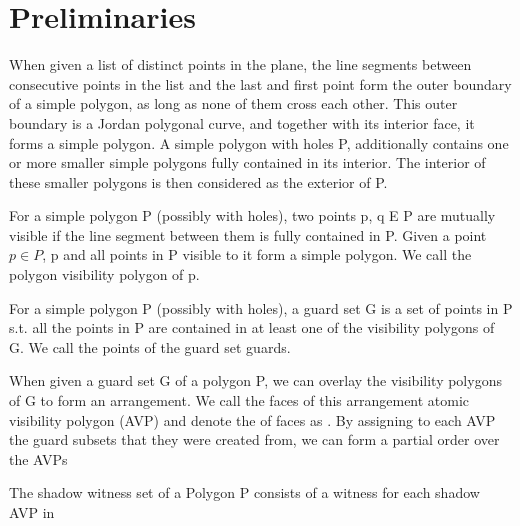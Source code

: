 \chapter{Preliminaries}
\begin{definition}
When given a list of distinct points in the plane, the line segments between consecutive points in the list and the last and first point form the outer boundary of a simple polygon, as long as none of them cross each other. This outer boundary is a Jordan polygonal curve, and together with its interior face, it forms a simple polygon. A simple polygon with holes P, additionally contains one or more smaller simple polygons fully contained in its interior. The interior of these smaller polygons is then considered as the exterior of P.
\end{definition}

\begin{definition}
For a simple polygon P (possibly with holes), two points p, q E P are mutually visible if the line segment between them is fully contained in P. Given a point $p\in P$, p and all points in P visible to it form a simple polygon. We call the polygon visibility polygon of p.
\end{definition}

\begin{definition}
For a simple polygon P (possibly with holes), a guard set G is a set of points in P s.t. all the points in P are contained in at least one of the visibility polygons of G. We call the points of the guard set guards.
\end{definition}

\begin{definition}
When given a guard set G of a polygon P, we can overlay the visibility polygons of G to form an arrangement. We call the faces of this arrangement atomic visibility polygon (AVP) and denote the of faces as $$. By assigning to each AVP the guard subsets that they were created from, we can form a partial order over the AVPs 
\end{definition}

\begin{definition}
The shadow witness set of a Polygon P consists of a witness for each shadow AVP in 
\end{definition}

\begin{definition}
    
\end{definition}

\begin{definition}
    
\end{definition}

\begin{definition}
    
\end{definition}

\begin{definition}
    
\end{definition}